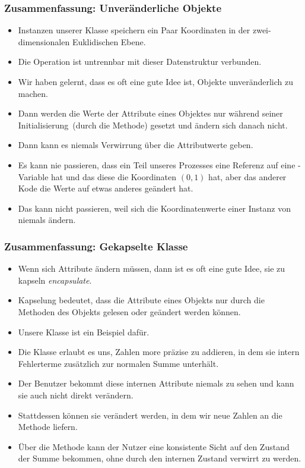 \documentclass[aspectratio=169,mathserif,notheorems]{beamer}%
\begin{document}
%
\begin{frame}%
\frametitle{Zusammenfassung: Unveränderliche Objekte}%
\begin{itemize}%
\item Instanzen unserer Klasse  speichern ein Paar Koordinaten in der zwei-dimensionalen Euklidischen Ebene.%
%
\item<2-> Die Operation  ist untrennbar mit dieser Datenstruktur verbunden.%
%
\item<3-> Wir haben gelernt, dass es oft eine gute Idee ist, Objekte unveränderlich zu machen.%
%
\item<4-> Dann werden die Werte der Attribute eines Objektes nur während seiner Initialisierung~(durch die  Methode) gesetzt und ändern sich danach nicht.%
%
\item<5-> Dann kann es niemals Verwirrung über die Attributwerte geben.%
%
\item<6-> Es kann nie passieren, dass ein Teil unseres Prozesses eine Referenz auf eine -Variable hat und  das diese die Koordinaten $(0,1)$ hat, aber das anderer Kode die Werte auf etwas anderes geändert hat.%
%
\item<7-> Das kann nicht passieren, weil sich die Koordinatenwerte einer Instanz von  niemals ändern.%
\end{itemize}%
\end{frame}%
%
\begin{frame}%
\frametitle{Zusammenfassung: Gekapselte Klasse}%
\begin{itemize}%
\item Wenn sich Attribute ändern müssen, dann ist es oft eine gute Idee, sie zu kapseln \emph{encapsulate}.%
%
\item<2-> Kapselung bedeutet, dass die Attribute eines Objekts nur durch die Methoden des Objekts gelesen oder geändert werden können.%
%
\item<3-> Unsere Klasse  ist ein Beispiel dafür.%
%
\item<4-> Die Klasse erlaubt es uns, Zahlen more präzise zu addieren, in dem sie intern Fehlerterme zusätzlich zur normalen Summe unterhält.%
%
\item<5-> Der Benutzer bekommt diese internen Attribute niemals zu sehen und kann sie auch nicht direkt verändern.%
%
\item<6-> Stattdessen können sie verändert werden, in dem wir neue Zahlen an die Methode  liefern.%
%
\item<7-> Über die Methode  kann der Nutzer eine konsistente Sicht auf den Zustand der Summe bekommen, ohne durch den internen Zustand verwirrt zu werden.%
\end{itemize}%
\end{frame}%
\end{document}
